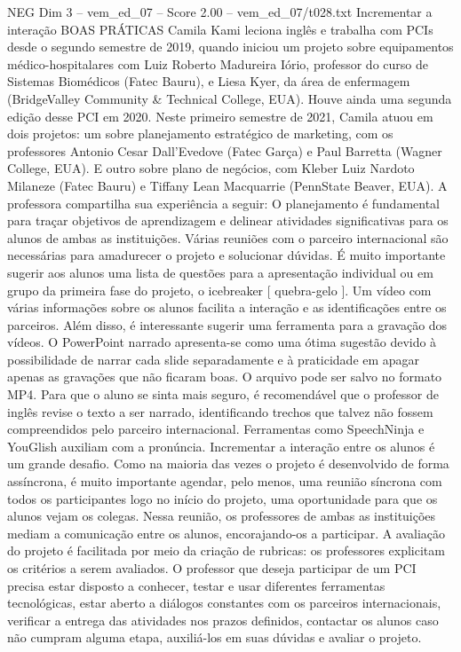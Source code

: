 \begin{textsample}{NEG Dim 3 – vem\_ed\_07 – Score 2.00 – vem\_ed\_07/t028.txt}  \label{ex:f3_neg_070}
Incrementar a interação BOAS PRÁTICAS Camila Kami leciona inglês e trabalha com PCIs desde o segundo semestre de 2019, quando iniciou um projeto sobre equipamentos médico-hospitalares com Luiz Roberto Madureira Iório, professor do curso de Sistemas Biomédicos (Fatec Bauru), e Liesa Kyer, da área de enfermagem (BridgeValley Community \& Technical College, EUA).
Houve ainda uma segunda edição desse PCI em 2020.
Neste primeiro semestre de 2021, Camila atuou em dois projetos: um sobre planejamento estratégico de marketing, com os professores Antonio Cesar Dall’Evedove (Fatec Garça) e Paul Barretta (Wagner College, EUA).
E outro sobre plano de negócios, com Kleber Luiz Nardoto Milaneze (Fatec Bauru) e Tiffany Lean Macquarrie (PennState Beaver, EUA).
A professora compartilha sua experiência a seguir: O planejamento é fundamental para traçar objetivos de aprendizagem e delinear atividades significativas para os alunos de ambas as instituições.
Várias reuniões com o parceiro internacional são necessárias para amadurecer o projeto e solucionar dúvidas.
É muito importante sugerir aos alunos uma lista de questões para a apresentação individual ou em grupo da primeira fase do projeto, o icebreaker [ quebra-gelo ].
Um vídeo com várias informações sobre os alunos facilita a interação e as identificações entre os parceiros.
Além disso, é interessante sugerir uma ferramenta para a gravação dos vídeos.
O PowerPoint narrado apresenta-se como uma ótima sugestão devido à possibilidade de narrar cada slide separadamente e à praticidade em apagar apenas as gravações que não ficaram boas.
O arquivo pode ser salvo no formato MP4.
Para que o aluno se sinta mais seguro, é recomendável que o professor de inglês revise o texto a ser narrado, identificando trechos que talvez não fossem compreendidos pelo parceiro internacional.
Ferramentas como SpeechNinja e YouGlish auxiliam com a pronúncia.
Incrementar a interação entre os alunos é um grande desafio.
Como na maioria das vezes o projeto é desenvolvido de forma assíncrona, é muito importante agendar, pelo menos, uma reunião síncrona com todos os participantes logo no início do projeto, uma oportunidade para que os alunos vejam os colegas.
Nessa reunião, os professores de ambas as instituições mediam a comunicação entre os alunos, encorajando-os a participar.
A avaliação do projeto é facilitada por meio da criação de rubricas: os professores explicitam os critérios a serem avaliados.
O professor que deseja participar de um PCI precisa estar disposto a conhecer, testar e usar diferentes ferramentas tecnológicas, estar aberto a diálogos constantes com os parceiros internacionais, verificar a entrega das atividades nos prazos definidos, contactar os alunos caso não cumpram alguma etapa, auxiliá-los em suas dúvidas e avaliar o projeto.

\end{textsample}
